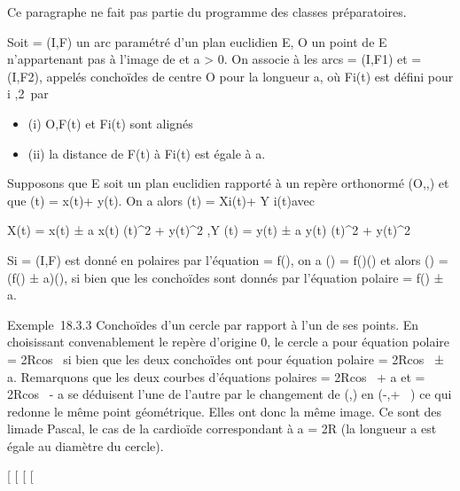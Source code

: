 Ce paragraphe ne fait pas partie du programme des classes préparatoires.

Soit \Gamma = (I,F) un arc paramétré d'un plan euclidien E, O un point de E
n'appartenant pas à l'image de \Gamma et a \textgreater{} 0. On associe à \Gamma
les arcs  = (I,F1) et  =
(I,F2), appelés conchoïdes de centre O pour la longueur a, où
Fi(t) est défini pour i
\in\1,2\ par

\begin{itemize}
\itemsep1pt\parskip0pt
\item
  (i) O,F(t) et Fi(t) sont alignés
\item
  (ii) la distance de F(t) à Fi(t) est égale à a.
\end{itemize}

Supposons que E soit un plan euclidien rapporté à un repère orthonormé
(O,\vec\imath,) et que
\overrightarrowOF(t) = x(t)\vec\imath +
y(t). On a alors
\overrightarrowOFi(t) =
Xi(t)\vec\imath + Y
i(t) avec

X(t) = x(t) ± a x(t) \over
\sqrtx(t)^2  + y(t)^2
,\quad Y (t) = y(t) ± a y(t) \over
\sqrtx(t)^2  + y(t)^2

Si \Gamma = (I,F) est donné en polaires par l'équation \rho = f(\theta), on a
\overrightarrowOF(\theta) =
f(\theta)\vecu(\theta) et alors
\overrightarrowOFi(\theta) = (f(\theta) ±
a)\vecu(\theta), si bien que les conchoïdes sont donnés
par l'équation polaire \rho = f(\theta) ± a.

Exemple~18.3.3 Conchoïdes d'un cercle par rapport à l'un de ses points.
En choisissant convenablement le repère d'origine 0, le cercle a pour
équation polaire \rho = 2Rcos~ \theta si bien que les
deux conchoïdes ont pour équation polaire \rho =
2Rcos~ \theta ± a. Remarquons que les deux courbes
d'équations polaires \rho = 2Rcos~ \theta + a et \rho =
2Rcos~ \theta - a se déduisent l'une de l'autre par
le changement de (\rho,\theta) en (-\rho,\theta + \pi~) ce qui redonne le même point
géométrique. Elles ont donc la même image. Ce sont des
lima\ccons de Pascal, le cas de la cardioïde
correspondant à a = 2R (la longueur a est égale au diamètre du cercle).

{[}
{[}
{[}
{[}
